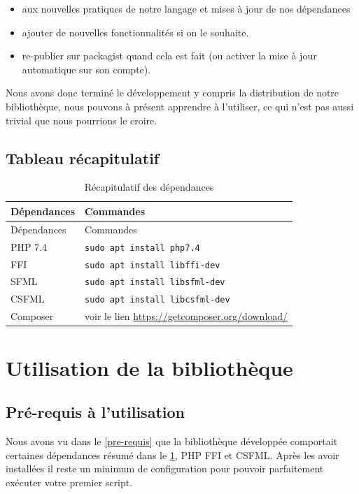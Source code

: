 \documentclass[11pt,a4paper,krantz2,11pt,oneside]{krantz}
\providecommand{\tightlist}{%
  \setlength{\itemsep}{0pt}\setlength{\parskip}{0pt}}
\begin{document}
\begin{itemize}
\tightlist
\item
  aux nouvelles pratiques de notre langage et mises à jour de nos dépendances
\item
  ajouter de nouvelles fonctionnalités si on le souhaite.
\item
  re-publier sur packagist quand cela est fait (ou activer la mise à jour automatique sur son compte).
\end{itemize}

Nous avons donc terminé le développement y compris la distribution de notre bibliothèque, nous pouvons à présent apprendre à l'utiliser, ce qui n'est pas aussi trivial que nous pourrions le croire.

\hypertarget{tableau-ruxe9capitulatif}{%
\section{Tableau récapitulatif}\label{tableau-ruxe9capitulatif}}

\begin{longtable}[]{@{}ll@{}}
\caption{\label{tab:recap-dep} Récapitulatif des dépendances}\tabularnewline
\toprule
Dépendances & Commandes\tabularnewline
\midrule
\endfirsthead
\toprule
Dépendances & Commandes\tabularnewline
\midrule
\endhead
PHP 7.4 & \texttt{sudo\ apt\ install\ php7.4}\tabularnewline
FFI & \texttt{sudo\ apt\ install\ libffi-dev}\tabularnewline
SFML & \texttt{sudo\ apt\ install\ libsfml-dev}\tabularnewline
CSFML & \texttt{sudo\ apt\ install\ libcsfml-dev}\tabularnewline
Composer & voir le lien \url{https://getcomposer.org/download/}\tabularnewline
\bottomrule
\end{longtable}

\hypertarget{utils}{%
\chapter{Utilisation de la bibliothèque}\label{utils}}

\hypertarget{utils-pre-requis}{%
\section{Pré-requis à l'utilisation}\label{utils-pre-requis}}

Nous avons vu dans le \ref{pre-requis} que la bibliothèque développée comportait certaines dépendances résumé dans le \ref{tab:recap-dep}, PHP FFI et CSFML. Après les avoir installées il reste un minimum de configuration pour pouvoir parfaitement exécuter votre premier script.
\end{document}

